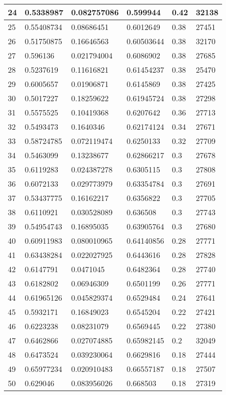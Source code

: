 \begin{longtable}{|l|l|l|l|l|l|}
24 & 0.5338987 & 0.082757086 & 0.599944 & 0.42 & 32138 \\ \hline 
25 & 0.55408734 & 0.08686451 & 0.6012649 & 0.38 & 27451 \\ \hline 
26 & 0.51750875 & 0.16646563 & 0.60503644 & 0.38 & 32170 \\ \hline 
27 & 0.596136 & 0.021794004 & 0.6086902 & 0.38 & 27685 \\ \hline 
28 & 0.5237619 & 0.11616821 & 0.61454237 & 0.38 & 25470 \\ \hline 
29 & 0.6005657 & 0.01906871 & 0.6145869 & 0.38 & 27425 \\ \hline 
30 & 0.5017227 & 0.18259622 & 0.61945724 & 0.38 & 27298 \\ \hline 
31 & 0.5575525 & 0.10419368 & 0.6207642 & 0.36 & 27713 \\ \hline 
32 & 0.5493473 & 0.1640346 & 0.62174124 & 0.34 & 27671 \\ \hline 
33 & 0.58724785 & 0.072119474 & 0.6250133 & 0.32 & 27709 \\ \hline 
34 & 0.5463099 & 0.13238677 & 0.62866217 & 0.3 & 27678 \\ \hline 
35 & 0.6119283 & 0.024387278 & 0.6305115 & 0.3 & 27808 \\ \hline 
36 & 0.6072133 & 0.029773979 & 0.63354784 & 0.3 & 27691 \\ \hline 
37 & 0.53437775 & 0.16162217 & 0.6356822 & 0.3 & 27705 \\ \hline 
38 & 0.6110921 & 0.030528089 & 0.636508 & 0.3 & 27743 \\ \hline 
39 & 0.54954743 & 0.16895035 & 0.63905764 & 0.3 & 27680 \\ \hline 
40 & 0.60911983 & 0.080010965 & 0.64140856 & 0.28 & 27771 \\ \hline 
41 & 0.63438284 & 0.022027925 & 0.6443616 & 0.28 & 27828 \\ \hline 
42 & 0.6147791 & 0.0471045 & 0.6482364 & 0.28 & 27740 \\ \hline 
43 & 0.6182802 & 0.06946309 & 0.6501199 & 0.26 & 27771 \\ \hline 
44 & 0.61965126 & 0.045829374 & 0.6529484 & 0.24 & 27641 \\ \hline 
45 & 0.5932171 & 0.16849023 & 0.6545204 & 0.22 & 27421 \\ \hline 
46 & 0.6223238 & 0.08231079 & 0.6569445 & 0.22 & 27380 \\ \hline 
47 & 0.6462866 & 0.027074885 & 0.65982145 & 0.2 & 32049 \\ \hline 
48 & 0.6473524 & 0.039230064 & 0.6629816 & 0.18 & 27444 \\ \hline 
49 & 0.65977234 & 0.020910483 & 0.66557187 & 0.18 & 27507 \\ \hline 
50 & 0.629046 & 0.083956026 & 0.668503 & 0.18 & 27319 \\ \hline 
\end{longtable}